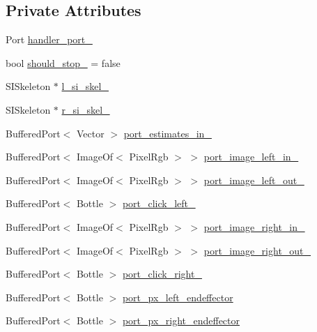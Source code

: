 \subsection*{Private Attributes}
\begin{DoxyCompactItemize}
\item 
Port \hyperlink{classRFMReaching_a916c972baaab67718ecada434ff94f98}{handler\+\_\+port\+\_\+}
\item 
bool \hyperlink{classRFMReaching_a8ca24ca1df3177f7a2086bffed644d61}{should\+\_\+stop\+\_\+} = false
\item 
S\+I\+Skeleton $\ast$ \hyperlink{classRFMReaching_aa63ad603740e3d869fc6224b7b95659b}{l\+\_\+si\+\_\+skel\+\_\+}
\item 
S\+I\+Skeleton $\ast$ \hyperlink{classRFMReaching_acbb2d80fdc4ac3222a302dfedf3aaa63}{r\+\_\+si\+\_\+skel\+\_\+}
\item 
Buffered\+Port$<$ Vector $>$ \hyperlink{classRFMReaching_a1851e362f374d6c44fedc2116a542e74}{port\+\_\+estimates\+\_\+in\+\_\+}
\item 
Buffered\+Port$<$ Image\+Of$<$ Pixel\+Rgb $>$ $>$ \hyperlink{classRFMReaching_a5972764c035d588da84616b3ca766841}{port\+\_\+image\+\_\+left\+\_\+in\+\_\+}
\item 
Buffered\+Port$<$ Image\+Of$<$ Pixel\+Rgb $>$ $>$ \hyperlink{classRFMReaching_a6a2e21f8fc0d2b96d4ac19c1c21d035f}{port\+\_\+image\+\_\+left\+\_\+out\+\_\+}
\item 
Buffered\+Port$<$ Bottle $>$ \hyperlink{classRFMReaching_ad2d1a565251ab36aab7650b1cf7840ce}{port\+\_\+click\+\_\+left\+\_\+}
\item 
Buffered\+Port$<$ Image\+Of$<$ Pixel\+Rgb $>$ $>$ \hyperlink{classRFMReaching_addc0188a22c5ab0555250721e02c6443}{port\+\_\+image\+\_\+right\+\_\+in\+\_\+}
\item 
Buffered\+Port$<$ Image\+Of$<$ Pixel\+Rgb $>$ $>$ \hyperlink{classRFMReaching_a76188810982db4710acbbb3c182f071d}{port\+\_\+image\+\_\+right\+\_\+out\+\_\+}
\item 
Buffered\+Port$<$ Bottle $>$ \hyperlink{classRFMReaching_a477a969c8c631cc7a468b0eefde2c05d}{port\+\_\+click\+\_\+right\+\_\+}
\item 
Buffered\+Port$<$ Bottle $>$ \hyperlink{classRFMReaching_ac9327dcf27ef947eb554d191362c0455}{port\+\_\+px\+\_\+left\+\_\+endeffector}
\item 
Buffered\+Port$<$ Bottle $>$ \hyperlink{classRFMReaching_a4ac92144c52def1b2990c0e7ed9f8b0d}{port\+\_\+px\+\_\+right\+\_\+endeffector}
\item 

\end{DoxyCompactItemize}
